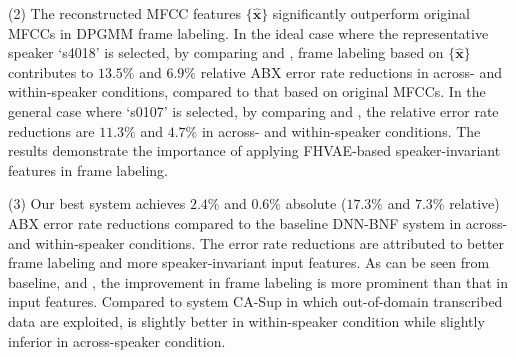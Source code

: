 \documentclass[a4paper]{article}
\def\X#1{%
        \raisebox{.9pt}{\textcircled{\raisebox{-.9pt}{#1}}}%
}
\begin{document}
(2) The reconstructed MFCC features $\{\bm{\hat{x}}\}$ significantly outperform original MFCCs in DPGMM frame labeling. 
In the ideal case  where the representative speaker `s4018'  is  selected, by comparing \X5 and \X1,  frame labeling based on $\{\bm{\hat{x}}\}$ contributes to  $13.5\%$ and $6.9\%$ relative ABX error rate reductions in across- and within-speaker conditions, compared to that based on original MFCCs. 
In the general case where `s0107' is selected, by comparing \X3 and \X1, the relative error rate reductions are  $11.3\%$ and $4.7\%$ in across- and within-speaker conditions.
The results demonstrate the importance of  applying FHVAE-based speaker-invariant features in frame labeling.


(3) Our best system \X5 achieves $2.4\%$ and $0.6\%$ absolute ($17.3\%$ and $7.3\%$ relative) ABX error rate reductions compared to the baseline DNN-BNF system in across- and within-speaker conditions. The error rate reductions are attributed to better frame labeling and more speaker-invariant input features.
As can be seen from baseline, \X1 and \X5, the improvement in frame labeling is more prominent than that in input features.
Compared to system CA-Sup in which out-of-domain transcribed data are exploited,  \X5 is slightly better in within-speaker condition while slightly inferior in across-speaker condition.  

\end{document}
